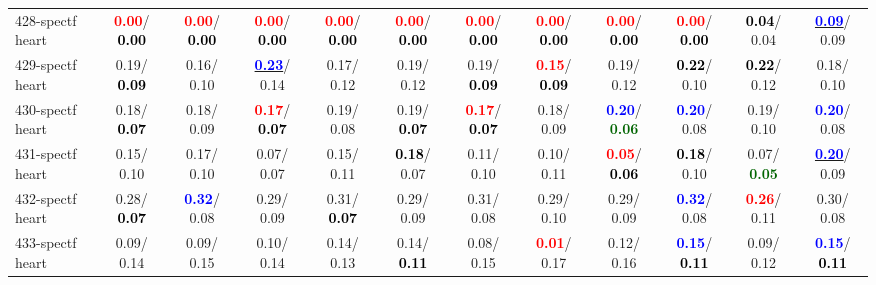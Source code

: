 \begin{table}[h]
\begin{center}
{\begin{tabular}{lc|c|c|c|c|c|c|c|c|c|c}
428-spectf heart & \textcolor{red}{\textbf{  0.00}}/\textcolor{black}{\textbf{  0.00}} & \textcolor{red}{\textbf{  0.00}}/\textcolor{black}{\textbf{  0.00}} & \textcolor{red}{\textbf{  0.00}}/\textcolor{black}{\textbf{  0.00}} & \textcolor{red}{\textbf{  0.00}}/\textcolor{black}{\textbf{  0.00}} & \textcolor{red}{\textbf{  0.00}}/\textcolor{black}{\textbf{  0.00}} & \textcolor{red}{\textbf{  0.00}}/\textcolor{black}{\textbf{  0.00}} & \textcolor{red}{\textbf{  0.00}}/\textcolor{black}{\textbf{  0.00}} & \textcolor{red}{\textbf{  0.00}}/\textcolor{black}{\textbf{  0.00}} & \textcolor{red}{\textbf{  0.00}}/\textcolor{black}{\textbf{  0.00}} & \textcolor{black}{\textbf{  0.04}}/  0.04 & \underline{\textcolor{blue}{\textbf{  0.09}}}/  0.09 \\
429-spectf heart &   0.19/\textcolor{black}{\textbf{  0.09}} &   0.16/  0.10 & \underline{\textcolor{blue}{\textbf{  0.23}}}/  0.14 &   0.17/  0.12 &   0.19/  0.12 &   0.19/\textcolor{black}{\textbf{  0.09}} & \textcolor{red}{\textbf{  0.15}}/\textcolor{black}{\textbf{  0.09}} &   0.19/  0.12 & \textcolor{black}{\textbf{  0.22}}/  0.10 & \textcolor{black}{\textbf{  0.22}}/  0.12 &   0.18/  0.10 \\
430-spectf heart &   0.18/\textcolor{black}{\textbf{  0.07}} &   0.18/  0.09 & \textcolor{red}{\textbf{  0.17}}/\textcolor{black}{\textbf{  0.07}} &   0.19/  0.08 &   0.19/\textcolor{black}{\textbf{  0.07}} & \textcolor{red}{\textbf{  0.17}}/\textcolor{black}{\textbf{  0.07}} &   0.18/  0.09 & \textcolor{blue}{\textbf{  0.20}}/\textcolor{darkgreen}{\textbf{  0.06}} & \textcolor{blue}{\textbf{  0.20}}/  0.08 &   0.19/  0.10 & \textcolor{blue}{\textbf{  0.20}}/  0.08 \\ \hline
431-spectf heart &   0.15/  0.10 &   0.17/  0.10 &   0.07/  0.07 &   0.15/  0.11 & \textcolor{black}{\textbf{  0.18}}/  0.07 &   0.11/  0.10 &   0.10/  0.11 & \textcolor{red}{\textbf{  0.05}}/\textcolor{black}{\textbf{  0.06}} & \textcolor{black}{\textbf{  0.18}}/  0.10 &   0.07/\textcolor{darkgreen}{\textbf{  0.05}} & \underline{\textcolor{blue}{\textbf{  0.20}}}/  0.09 \\
432-spectf heart &   0.28/\textcolor{black}{\textbf{  0.07}} & \textcolor{blue}{\textbf{  0.32}}/  0.08 &   0.29/  0.09 &   0.31/\textcolor{black}{\textbf{  0.07}} &   0.29/  0.09 &   0.31/  0.08 &   0.29/  0.10 &   0.29/  0.09 & \textcolor{blue}{\textbf{  0.32}}/  0.08 & \textcolor{red}{\textbf{  0.26}}/  0.11 &   0.30/  0.08 \\
433-spectf heart &   0.09/  0.14 &   0.09/  0.15 &   0.10/  0.14 &   0.14/  0.13 &   0.14/\textcolor{black}{\textbf{  0.11}} &   0.08/  0.15 & \textcolor{red}{\textbf{  0.01}}/  0.17 &   0.12/  0.16 & \textcolor{blue}{\textbf{  0.15}}/\textcolor{black}{\textbf{  0.11}} &   0.09/  0.12 & \textcolor{blue}{\textbf{  0.15}}/\textcolor{black}{\textbf{  0.11}} \\

\end{tabular}}
\end{center}
\end{table}
